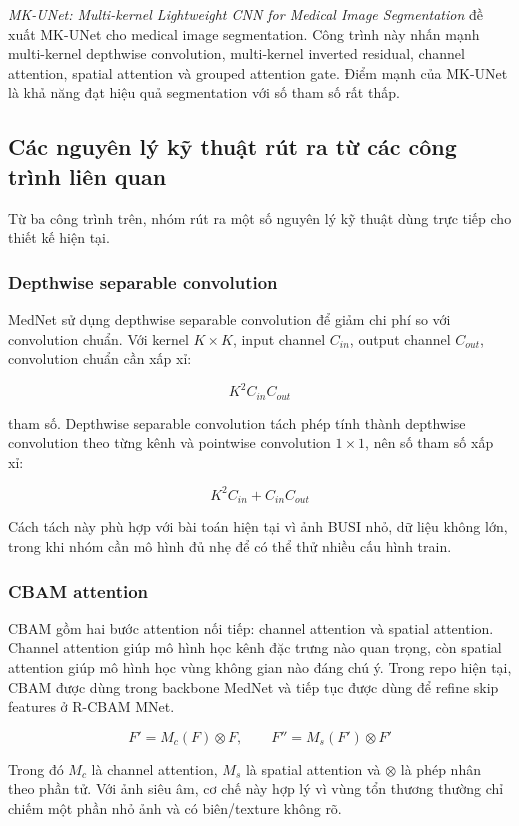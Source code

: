 \documentclass[12pt,a4paper]{article}
\begin{document}
\textit{MK-UNet: Multi-kernel Lightweight CNN for Medical Image Segmentation} đề xuất MK-UNet cho medical image segmentation. Công trình này nhấn mạnh multi-kernel depthwise convolution, multi-kernel inverted residual, channel attention, spatial attention và grouped attention gate. Điểm mạnh của MK-UNet là khả năng đạt hiệu quả segmentation với số tham số rất thấp.

\subsection{Các nguyên lý kỹ thuật rút ra từ các công trình liên quan}

Từ ba công trình trên, nhóm rút ra một số nguyên lý kỹ thuật dùng trực tiếp cho thiết kế hiện tại.

\subsubsection*{Depthwise separable convolution}

MedNet sử dụng depthwise separable convolution để giảm chi phí so với convolution chuẩn. Với kernel \(K \times K\), input channel \(C_{in}\), output channel \(C_{out}\), convolution chuẩn cần xấp xỉ:

\[
K^2 C_{in} C_{out}
\]

tham số. Depthwise separable convolution tách phép tính thành depthwise convolution theo từng kênh và pointwise convolution \(1 \times 1\), nên số tham số xấp xỉ:

\[
K^2 C_{in} + C_{in} C_{out}
\]

Cách tách này phù hợp với bài toán hiện tại vì ảnh BUSI nhỏ, dữ liệu không lớn, trong khi nhóm cần mô hình đủ nhẹ để có thể thử nhiều cấu hình train.

\subsubsection*{CBAM attention}

CBAM gồm hai bước attention nối tiếp: channel attention và spatial attention. Channel attention giúp mô hình học kênh đặc trưng nào quan trọng, còn spatial attention giúp mô hình học vùng không gian nào đáng chú ý. Trong repo hiện tại, CBAM được dùng trong backbone MedNet và tiếp tục được dùng để refine skip features ở R-CBAM MNet.

\[
F' = M_c(F) \otimes F,\qquad
F'' = M_s(F') \otimes F'
\]

Trong đó \(M_c\) là channel attention, \(M_s\) là spatial attention và \(\otimes\) là phép nhân theo phần tử. Với ảnh siêu âm, cơ chế này hợp lý vì vùng tổn thương thường chỉ chiếm một phần nhỏ ảnh và có biên/texture không rõ.
\end{document}
